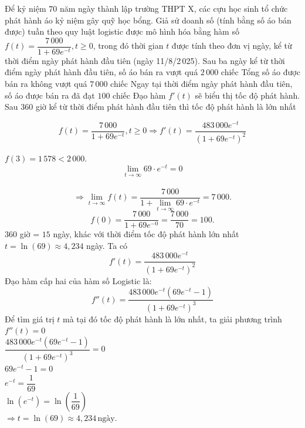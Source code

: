 \TNTF
\begin{ex}%
Để kỷ niệm $70$ năm ngày thành lập trường THPT X, các cựu học sinh tổ chức phát hành áo kỷ niệm gây quỹ học bổng. Giả sử doanh số (tính bằng số áo bán được) tuần theo quy luật logistic được mô hình hóa bằng hàm số $f(t)=\dfrac{7\,000}{1+69e^{-t}}, t \ge 0$, trong đó thời gian $t$ được tính theo đơn vị ngày, kể từ thời điểm ngày phát hành đầu tiên (ngày 11/8/2\,025).
\choiceTF
{Sau ba ngày kể từ thời điểm ngày phát hành đầu tiên, số áo bán ra vượt quá $2\,000$ chiếc}
{\True Tổng số áo được bán ra không vượt quá $7\,000$ chiếc}
{\True Ngay tại thời điểm ngày phát hành đầu tiên, số áo được bán ra đã đạt $100$ chiếc}
{Đạo hàm $f'(t)$ sẽ biểu thị tốc độ phát hành. Sau $360$ giờ kể từ thời điểm phát hành đầu tiên thì tốc độ phát hành là lớn nhất}
\loigiai 
{$$f(t)=\dfrac{7\,000}{1+69e^{- t}}, t \ge 0 \Rightarrow f'(t) = \dfrac{483\,000e^{-t}}{(1 + 69e^{-t})^2}$$
\begin{itemchoice}
\itemch $f(3)=1\,578 < 2\,000$.
\itemch $$\lim_{t\to\infty} 69\cdot e^{-t} = 0$$\\$$\Rightarrow \lim_{t\to\infty}f(t)= \dfrac{7\,000}{1 + \lim_{t\to\infty} 69\cdot e^{-t}} = 7\,000.$$
\itemch $$f(0)=\dfrac{7\,000}{1+69e^{- 0}}=\dfrac{7\,000}{70}=100.$$
\itemch $360$ giờ = $15$ ngày, khác với thời điểm tốc độ phát hành lớn nhất $t=\ln(69)\approx 4{,}234$ ngày.
Ta có 
$$ f'(t) = \dfrac{483\,000e^{-t}}{(1 + 69e^{-t})^2}$$
Đạo hàm cấp hai của hàm số Logistic là:
$$f''(t) = \dfrac{483\,000e^{-t} (69e^{-t} - 1)}{(1 + 69e^{-t})^3}$$
Để tìm giá trị $t$ mà tại đó tốc độ phát hành là lớn nhất, ta giải phương trình $f''(t) = 0$\\
$\dfrac{483\,000e^{-t} (69e^{-t} - 1)}{(1 + 69e^{-t})^3} = 0$\\
$69e^{-t} - 1 = 0$\\
$e^{-t} = \dfrac{1}{69}$\\
$\ln(e^{-t}) = \ln\left(\dfrac{1}{69}\right)$\\
$\Rightarrow t = \ln(69) \approx 4{,}234\, \text{ngày}$.
\end{itemchoice}
}
\end{ex}
